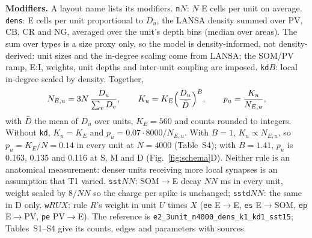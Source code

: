 \textbf{Modifiers.} A layout name lists its modifiers. \texttt{n}$N$: $N$ E cells per unit on average.
\texttt{dens}: E cells per unit proportional to $D_u$, the LANSA density summed over PV, CB, CR and NG, averaged over the
unit's depth bins (median over areas). The sum over types is a size proxy only, so the model is density-informed, not density-derived: unit sizes and the in-degree scaling come
from LANSA; the SOM/PV ramp, E:I, weights, unit depths and inter-unit coupling are imposed. \texttt{kd}$B$: local in-degree scaled by
density. Together,
\begin{equation*}
N_{E,u} = 3N\,\frac{D_u}{\sum_v D_v}, \qquad K_u = K_E\Bigl(\frac{D_u}{\bar D}\Bigr)^{B}, \qquad
p_u = \frac{K_u}{N_{E,u}},
\end{equation*}
with $\bar D$ the mean of $D_u$ over units, $K_E = 560$ and counts rounded to integers. Without \texttt{kd},
$K_u = K_E$ and $p_u = 0.07\cdot 8000/N_{E,u}$. With $B = 1$, $K_u \propto N_{E,u}$, so $p_u = K_E/N = 0.14$ in
every unit at $N = 4000$ (Table~S4); with $B = 1.41$, $p_u$ is 0.163, 0.135 and 0.116 at S, M and D (Fig.~\ref{fig:schema}D).
Neither rule is an anatomical measurement: denser units receiving more local synapses is an assumption that T1
varied. \texttt{sst}$NN$: SOM$\to$E decay
$NN$ ms in every unit, weight scaled by $8/NN$ so the charge per spike is unchanged; \texttt{sstd}$NN$: the same in
D only. \texttt{w}$RUX$: rule $R$'s weight in unit $U$ times $X$ (\texttt{ee} E$\to$E, \texttt{es} E$\to$SOM,
\texttt{ep} E$\to$PV, \texttt{pe} PV$\to$E). The reference is \texttt{e2\_3unit\_n4000\_dens\_k1\_kd1\_sst15};
Tables~S1--S4 give its counts, edges and parameters with sources.


